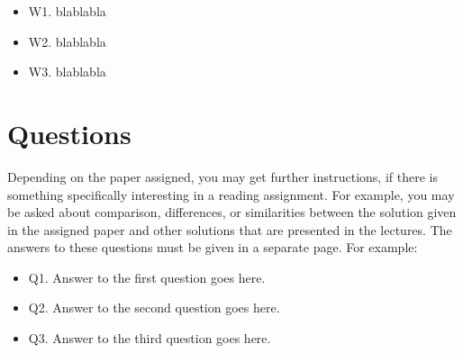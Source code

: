 \documentclass[10pt]{proc}
\begin{document}
\begin{itemize}
 \item W1. blablabla
 \item W2. blablabla
 \item W3. blablabla
\end{itemize}

\newpage
\section{Questions}
Depending on the paper assigned, you may get further instructions, if there is something specifically interesting in a reading assignment. For example, you may be asked about comparison, differences, or similarities between the solution given in the assigned paper and other solutions that are presented in the lectures. The answers to these questions must be given in a separate page. For example:
\begin{itemize}
 \item Q1. Answer to the first question goes here.
 \item Q2. Answer to the second question goes here.
 \item Q3. Answer to the third question goes here.
\end{itemize}
\end{document}
